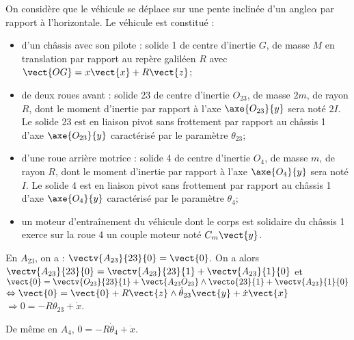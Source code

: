  On considère que le véhicule se déplace sur une pente inclinée d’un angle$\alpha$ par rapport à l’horizontale. Le véhicule est constitué :
\begin{itemize}
\item  d’un châssis avec son pilote : solide 1 de centre d’inertie $G$, de masse $M$ en translation par rapport au repère galiléen $R$ avec $\vect{OG}=x\vect{x}+R\vect{z}$;
\item de deux roues avant : solide 23 de centre d’inertie $O_{23}$, de masse $2 m$, de rayon $R$, dont le moment d’inertie par rapport à l’axe $\axe{O_{23}}{{y}}$ sera noté $2I$. Le solide 23 est en liaison pivot sans frottement par rapport au châssis 1 d’axe $\axe{O_{23}}{{y}}$ caractérisé par le paramètre $\theta_{23}$;
\item d’une roue arrière motrice : solide 4 de centre d’inertie $O_4$, de masse $m$, de rayon $R$, dont le moment d’inertie par rapport à l’axe $\axe{O_{4}}{{y}}$ sera noté $I$. Le solide 4 est en liaison pivot sans frottement par rapport au châssis 1 d’axe $\axe{O_{4}}{{y}}$ caractérisé par le paramètre $\theta_4$; 
\item un moteur d’entraînement du véhicule dont le corps est solidaire du châssis 1 exerce sur la roue 4 un couple moteur noté $C_m \vect{y}$. 
\end{itemize}





\fi

\ifprof
\begin{corrige}
En $A_{23}$, on a : $\vectv{A_{23}}{23}{0}=\vect{0}$. On a alors $\vectv{A_{23}}{23}{0}=\vectv{A_{23}}{23}{1}+\vectv{A_{23}}{1}{0}$ et $\vect{0}=\vectv{O_{23}}{23}{1}+\vect{A_{23}O_{23}}\wedge \vecto{23}{1}+\vectv{A_{23}}{1}{0} $ $\Leftrightarrow \vect{0}=\vect{0}+R\vect{z}\wedge \dot{\theta}_{23}\vect{y} + \dot{x}\vect{x}$ $\Rightarrow 0=-R \dot{\theta}_{23} + \dot{x}$.

De même en $A_4$, $0=-R \dot{\theta}_{4} + \dot{x}$.
\end{corrige}
\else
\fi

